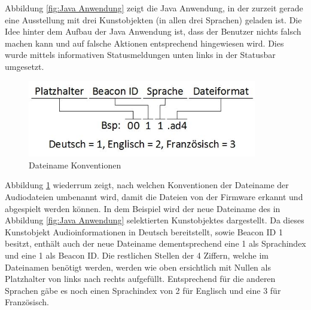 Abbildung \ref{fig:Java Anwendung} zeigt die Java Anwendung, in der zurzeit gerade eine Ausstellung mit drei Kunstobjekten (in allen drei Sprachen) geladen ist. Die Idee hinter dem Aufbau der Java Anwendung ist, dass der Benutzer nichts falsch machen kann und auf falsche Aktionen entsprechend hingewiesen wird. Dies wurde mittels informativen Statusmeldungen unten links in der Statusbar umgesetzt.

\begin{figure}[htb]
	\centering
	\includegraphics[width=10cm]{graphics/Dateiname_Konvention.jpeg}
	\caption{Dateiname Konventionen}
	\label{fig:Dateiname Konventionen}
\end{figure}

Abbildung \ref{fig:Dateiname Konventionen} wiederrum zeigt, nach welchen Konventionen der Dateiname der Audiodateien umbenannt wird, damit die Dateien von der Firmware erkannt und abgespielt werden können. In dem Beispiel wird der neue Dateiname des in Abbildung \ref{fig:Java Anwendung} selektierten Kunstobjektes dargestellt. Da dieses Kunstobjekt Audioinformationen in Deutsch bereitstellt, sowie Beacon ID 1 besitzt, enthält auch der neue Dateiname dementsprechend eine 1 als Sprachindex und eine 1 als Beacon ID. Die restlichen Stellen der 4 Ziffern, welche im Dateinamen benötigt werden, werden wie oben ersichtlich mit Nullen als Platzhalter von links nach rechts aufgefüllt. Entsprechend für die anderen Sprachen gäbe es noch einen Sprachindex von 2 für Englisch und eine 3 für Französisch.
